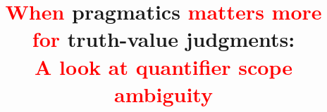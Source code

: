 \documentclass[preprint,authoryear]{elsarticle}\frenchspacing
\newcommand{\lp}[1]{\textcolor{red}{#1}} %
\begin{document}
\frenchspacing 


\begin{frontmatter}

\title{\lp{When} pragmatics \lp{matters more \\ 
for} truth-value judgments: \\
\lp{
A look at quantifier scope ambiguity}} 






\end{frontmatter}
\end{document}
